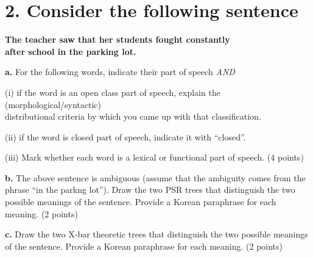 \documentclass{article}
\begin{document}
\section{2. Consider the following sentence \normalsize}
\begin{center}
     \textbf{The teacher saw that her students fought constantly \\ after school in the parking lot.} \par
\end{center}
\bigskip
\noindent \textbf{a.} For the following words, indicate their part of speech \textit{AND} \par
\medskip \noindent (i) if the word is an open class part of speech, explain the (morphological/syntactic)\\ distributional criteria by which you came up with that classification.\par
\vspace{1em}
\noindent (ii) if the word is closed part of speech, indicate it with ``closed''.\par
\vspace{1em}
\noindent (iii) Mark whether each word is a lexical or functional part of speech. (4 points) \par
\vspace{2em}
\begin{description}
    \setlength{\itemsep}{2em}
    \item[\textbf{The}]
    \item[\textbf{Teacher}] 
    \item[\textbf{Saw}] 
    \item[\textbf{That}] 
    \item[\textbf{Her}] 
    \item[\textbf{Constantly}]
    \item[\textbf{After}]
    \item[\textbf{Parking}]   
\end{description}

\newpage
\noindent \textbf{b.} The above sentence is ambiguous (assume that the ambiguity comes from the phrase ``in the parkng lot''). Draw the two PSR trees that distinguish the two possible meanings of the sentence. Provide a Korean paraphrase for each meaning. (2 points) \par

\vspace{8cm}
\noindent \textbf{c.} Draw the two X-bar theoretic trees that distinguish the two possible meanings of the sentence. Provide a Korean paraphrase for each meaning. (2 points)
\end{document}
